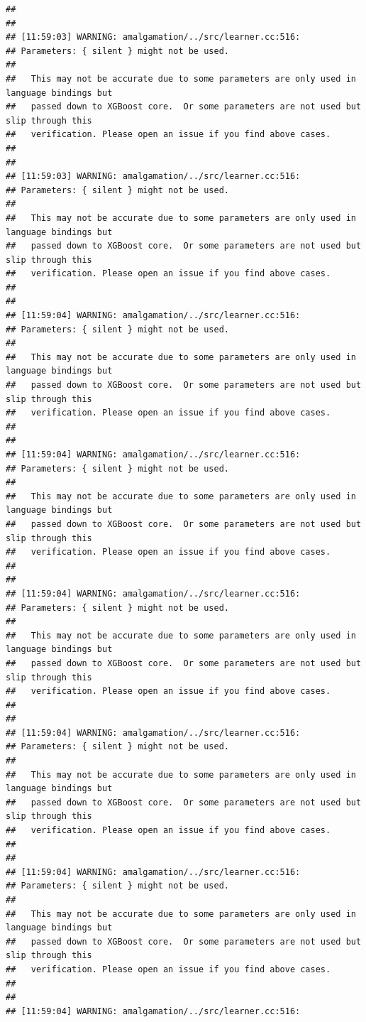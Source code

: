 \documentclass[AMS,STIX2COL]{WileyNJD-v2}\usepackage[]{graphicx}\usepackage[]{color}
\makeatletter
\newenvironment{kframe}{%
 \def\at@end@of@kframe{}%
 \ifinner\ifhmode%
  \def\at@end@of@kframe{\end{minipage}}%
  \begin{minipage}{\columnwidth}%
 \fi\fi%
 \def\FrameCommand##1{\hskip\@totalleftmargin \hskip-\fboxsep
 \colorbox{shadecolor}{##1}\hskip-\fboxsep
     \hskip-\linewidth \hskip-\@totalleftmargin \hskip\columnwidth}%
 \MakeFramed {\advance\hsize-\width
   \@totalleftmargin\z@ \linewidth\hsize
   \@setminipage}}%
 {\par\unskip\endMakeFramed%
 \at@end@of@kframe}
\newenvironment{knitrout}{}{} %
\makeatother
\begin{document}
\begin{knitrout}
\begin{kframe}
\begin{verbatim}
## 
## 
## [11:59:03] WARNING: amalgamation/../src/learner.cc:516: 
## Parameters: { silent } might not be used.
## 
##   This may not be accurate due to some parameters are only used in language bindings but
##   passed down to XGBoost core.  Or some parameters are not used but slip through this
##   verification. Please open an issue if you find above cases.
## 
## 
## [11:59:03] WARNING: amalgamation/../src/learner.cc:516: 
## Parameters: { silent } might not be used.
## 
##   This may not be accurate due to some parameters are only used in language bindings but
##   passed down to XGBoost core.  Or some parameters are not used but slip through this
##   verification. Please open an issue if you find above cases.
## 
## 
## [11:59:04] WARNING: amalgamation/../src/learner.cc:516: 
## Parameters: { silent } might not be used.
## 
##   This may not be accurate due to some parameters are only used in language bindings but
##   passed down to XGBoost core.  Or some parameters are not used but slip through this
##   verification. Please open an issue if you find above cases.
## 
## 
## [11:59:04] WARNING: amalgamation/../src/learner.cc:516: 
## Parameters: { silent } might not be used.
## 
##   This may not be accurate due to some parameters are only used in language bindings but
##   passed down to XGBoost core.  Or some parameters are not used but slip through this
##   verification. Please open an issue if you find above cases.
## 
## 
## [11:59:04] WARNING: amalgamation/../src/learner.cc:516: 
## Parameters: { silent } might not be used.
## 
##   This may not be accurate due to some parameters are only used in language bindings but
##   passed down to XGBoost core.  Or some parameters are not used but slip through this
##   verification. Please open an issue if you find above cases.
## 
## 
## [11:59:04] WARNING: amalgamation/../src/learner.cc:516: 
## Parameters: { silent } might not be used.
## 
##   This may not be accurate due to some parameters are only used in language bindings but
##   passed down to XGBoost core.  Or some parameters are not used but slip through this
##   verification. Please open an issue if you find above cases.
## 
## 
## [11:59:04] WARNING: amalgamation/../src/learner.cc:516: 
## Parameters: { silent } might not be used.
## 
##   This may not be accurate due to some parameters are only used in language bindings but
##   passed down to XGBoost core.  Or some parameters are not used but slip through this
##   verification. Please open an issue if you find above cases.
## 
## 
## [11:59:04] WARNING: amalgamation/../src/learner.cc:516: 

\end{verbatim}
\end{kframe}
\end{knitrout}
\end{document}
